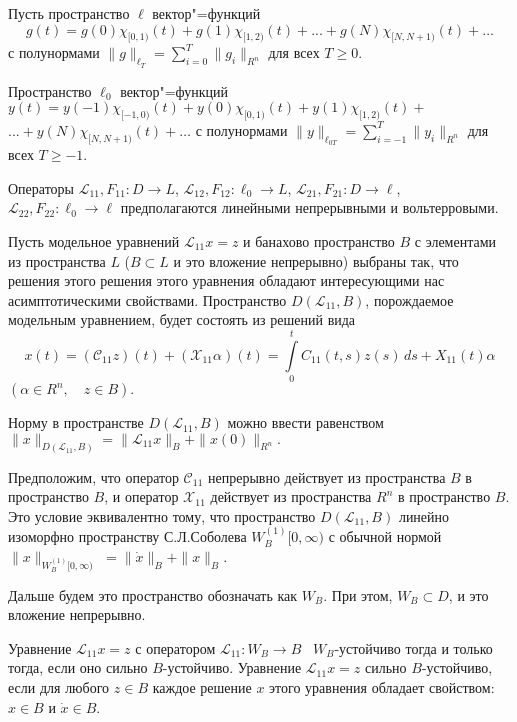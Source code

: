 Пусть пространство $\ell $ вектор"=функций $$g(t)=g(0)\chi _{[0,1)} (t)+g(1)\chi _{[1,2)} (t)+...+g(N)\chi _{[N,N+1)} (t)+\ldots $$
 с полунормами $\|g\|_{\ell _{T} } =\sum\limits_{i=0}^{T}\|g_{i} \|_{R^n} $ для всех $T\geq 0$.

Пространство $\ell _{0} $ вектор"=функций $y(t)=y(-1)\chi _{[-1,0)} (t)+y(0)\chi _{[0,1)} (t)+y(1)\chi _{[1,2)} (t)+$ $...+y(N)\chi _{[N,N+1)} (t)+\ldots $ с полунормами $\|y\|_{\ell _{0T} } =\sum\limits_{i=-1}^{T}\|y_{i} \|_{R^n} $ для всех $T\ge -1$.

Операторы ${\mathcal L}_{11} ,F_{11} :D\to L$, ${\mathcal L}_{12} ,F_{12} :\ell _{0} \to L$, ${\mathcal L}_{21} ,F_{21} :D\to \ell $, $
{\mathcal L}_{22} ,F_{22} :\ell _{0} \to \ell $ предполагаются линейными непрерывными и вольтерровыми.

Пусть модельное уравнений ${\mathcal L}_{11} x=z$ и банахово пространство $B$ с элементами из пространства $L$ ($B\subset L$ и это вложение непрерывно) выбраны так, что решения этого решения этого уравнения обладают интересующими нас асимптотическими свойствами. Пространство $D({\mathcal L}_{11} ,B)$, порождаемое модельным уравнением, будет состоять из решений вида
$$
x(t)=\left({\mathcal C}_{11} z\right)(t)+({\mathcal X}_{11} \alpha )(t)= \int\limits_0^t C_{11}(t,s)z(s)\,ds + X_{11}(t)\alpha
$$
$
(\alpha \in R^n, \quad z\in B).
$

Норму в пространстве $D({\mathcal L}_{11} ,B)$ можно ввести равенством
$\|x\|_{D({\mathcal L}_{11} ,B)} = \|{\mathcal L}_{11} x\|_{B} +\|x(0)\|_{R^n}.$

Предположим, что оператор ${\mathcal C}_{11} $ непрерывно действует из пространства $B$ в пространство $B$, и оператор ${\mathcal X}_{11} $ действует из пространства $R^n$ в пространство $B$. Это условие эквивалентно тому, что пространство $D({\mathcal L}_{11} ,B)$ линейно изоморфно пространству С.Л.Соболева $W_{B}^{(1)} [0,\infty )$ с обычной нормой
$\|x\|_{W_{B}^{(1)} [0,\infty )}$ $=\|\dot{x}\|_{B} +\|x\|_{B}.$

Дальше будем это пространство обозначать как $W_{B} $. При этом, $W_{B} \subset D$, и это вложение непрерывно.

Уравнение ${\mathcal L}_{11} x=z$ с оператором ${\mathcal L}_{11} :W_{B} \to B$ \, $W_{B} $-ус\-т\-о\-й\-чи\-во тогда и только тогда, если оно сильно $B$-ус\-т\-о\-й\-чи\-во. Уравнение ${\mathcal L}_{11} x=z$ сильно $B$-ус\-т\-о\-й\-чи\-во, если для любого $z\in B$ каждое решение $x$ этого уравнения обладает свойством: $x\in B$ и $\dot{x}\in B$.

